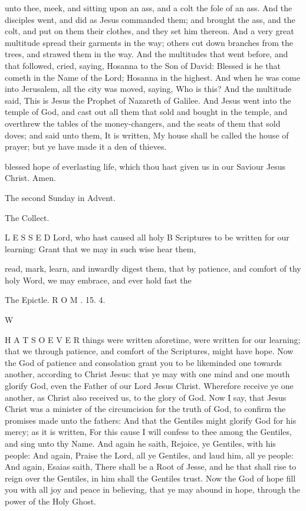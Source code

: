 unto thee, meek, and sitting upon an ass, and a colt the fole of an ass. And the disciples went, and did as Jesus commanded them; and brought the ass, and the colt, and put on them their clothes, and they set him thereon. And a very great multitude spread their garments in the way; others cut down branches from the trees, and strawed them in the way. And the multitudes that went before, and that followed, cried, saying, Hosanna to the Son of David: Blessed is he that cometh in the Name of the Lord; Hosanna in the highest. And when he was come into Jerusalem, all the city was moved, saying, Who is this? And the multitude said, This is Jesus the Prophet of Nazareth of Galilee. And Jesus went into the temple of God, and cast out all them that sold and bought in the temple, and overthrew the tables of the money-changers, and the seats of them that sold doves; and said unto them, It is written, My house shall be called the house of prayer; but ye have made it a den of thieves.

blessed hope of everlasting life, which thou hast given us in our Saviour Jesus Christ. Amen.

The second Sunday in Advent.

The Collect.

L E S S E D Lord, who hast caused all holy B Scriptures to be written for our learning: Grant that we may in such wise hear them,

read, mark, learn, and inwardly digest them, that by patience, and comfort of thy holy Word, we may embrace, and ever hold fast the

The Epictle. R O M . 15. 4.

W

H A T S O E V E R things were written aforetime, were written for our learning; that we through patience, and comfort of the Scriptures, might have hope. Now the God of patience and consolation grant you to be likeminded one towards another, according to Christ Jesus: that ye may with one mind and one mouth glorify God, even the Father of our Lord Jesus Christ. Wherefore receive ye one another, as Christ also received us, to the glory of God. Now I say, that Jesus Christ was a minister of the circumcision for the truth of God, to confirm the promises made unto the fathers: And that the Gentiles might glorify God for his mercy; as it is written, For this cause I will confess to thee among the Gentiles, and sing unto thy Name. And again he saith, Rejoice, ye Gentiles, with his people: And again, Praise the Lord, all ye Gentiles, and laud him, all ye people: And again, Esaias saith, There shall be a Root of Jesse, and he that shall rise to reign over the Gentiles, in him shall the Gentiles trust. Now the God of hope fill you with all joy and peace in believing, that ye may abound in hope, through the power of the Holy Ghost.

